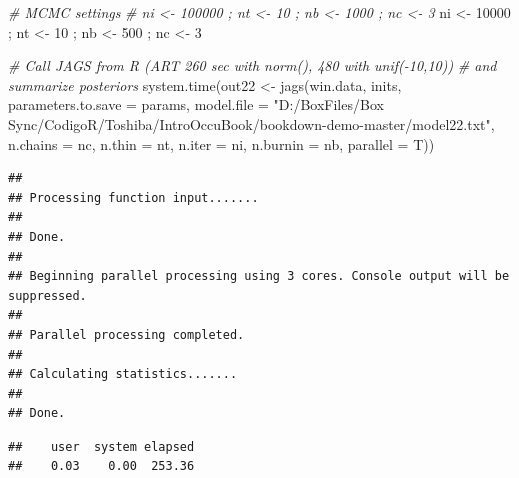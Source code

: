 \documentclass[
]{book}
\newenvironment{Shaded}{\begin{snugshade}}{\end{snugshade}}
\newcommand{\AttributeTok}[1]{\textcolor[rgb]{0.77,0.63,0.00}{#1}}
\newcommand{\CommentTok}[1]{\textcolor[rgb]{0.56,0.35,0.01}{\textit{#1}}}
\newcommand{\DecValTok}[1]{\textcolor[rgb]{0.00,0.00,0.81}{#1}}
\newcommand{\FunctionTok}[1]{\textcolor[rgb]{0.00,0.00,0.00}{#1}}
\newcommand{\NormalTok}[1]{#1}
\newcommand{\OtherTok}[1]{\textcolor[rgb]{0.56,0.35,0.01}{#1}}
\newcommand{\SpecialCharTok}[1]{\textcolor[rgb]{0.00,0.00,0.00}{#1}}
\newcommand{\StringTok}[1]{\textcolor[rgb]{0.31,0.60,0.02}{#1}}
\begin{document}
\begin{Shaded}
\begin{Highlighting}[]
\CommentTok{\# MCMC settings}
\CommentTok{\# ni \textless{}{-} 100000   ;   nt \textless{}{-} 10   ;   nb \textless{}{-} 1000   ;   nc \textless{}{-} 3}
\NormalTok{ ni }\OtherTok{\textless{}{-}} \DecValTok{10000}\NormalTok{   ;   nt }\OtherTok{\textless{}{-}} \DecValTok{10}\NormalTok{   ;   nb }\OtherTok{\textless{}{-}} \DecValTok{500}\NormalTok{   ;   nc }\OtherTok{\textless{}{-}} \DecValTok{3}

\CommentTok{\# Call JAGS from R (ART 260 sec with norm(), 480 with unif({-}10,10)) }
\CommentTok{\# and summarize posteriors}
\FunctionTok{system.time}\NormalTok{(out22 }\OtherTok{\textless{}{-}} \FunctionTok{jags}\NormalTok{(win.data, inits, }\AttributeTok{parameters.to.save =}\NormalTok{ params,}
                      \AttributeTok{model.file =} \StringTok{"D:/BoxFiles/Box Sync/CodigoR/Toshiba/IntroOccuBook/bookdown{-}demo{-}master/model22.txt"}\NormalTok{, }
                          \AttributeTok{n.chains =}\NormalTok{ nc, }
                          \AttributeTok{n.thin =}\NormalTok{ nt, }
                          \AttributeTok{n.iter =}\NormalTok{ ni, }
                          \AttributeTok{n.burnin =}\NormalTok{ nb, }
                          \AttributeTok{parallel =}\NormalTok{ T))}
\end{Highlighting}
\end{Shaded}

\begin{verbatim}
## 
## Processing function input....... 
## 
## Done. 
##  
## Beginning parallel processing using 3 cores. Console output will be suppressed.
## 
## Parallel processing completed.
## 
## Calculating statistics....... 
## 
## Done.
\end{verbatim}

\begin{verbatim}
##    user  system elapsed 
##    0.03    0.00  253.36
\end{verbatim}

\begin{Shaded}
\end{Shaded}
\end{document}
